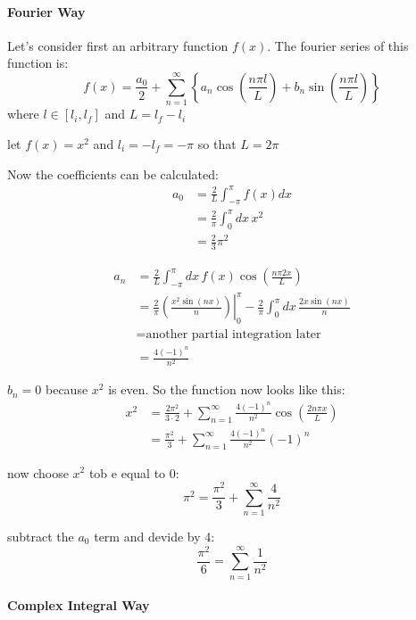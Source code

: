 \paragraph{Fourier Way}
Let's consider first an arbitrary function $f(x)$. The fourier series of this function is:
\begin{equation}
f(x) = \frac{a_0}{2} + \sum_{n=1}^\infty \left\lbrace a_n \cos\left( \frac{n \pi l}{L}  \right) + b_n \sin \left(  \frac{n \pi l}{L} \right)  \right\rbrace
\end{equation}
where $l\in [l_i,l_f]$ and $L = l_f - l_i$

let $f(x) = x^2$ and $l_i = -l_f = -\pi$ so that $L = 2\pi$

Now the coefficients can be calculated:
\begin{align}
a_0 &= \frac{2}{L} \int_{-\pi}^\pi f(x) dx \\
&= \frac{2}{\pi} \int_0^\pi dx\, x^2\\
&= \frac{2}{3}\pi^2
\end{align}

\begin{align}
a_n &= \frac{2}{L} \int_{-\pi}^\pi dx\, f(x) \cos\left(\frac{n \pi 2 x}{L} \right) \\
&= \frac{2}{\pi }\left.\left(  \frac{x^2 \sin(nx)}{n} \right)\right|_0^\pi - \frac{2}{\pi} \int_0^\pi dx\, \frac{2x \sin(nx)}{n}\\
&=\text{another partial integration later}\\
&= \frac{4 (-1)^n}{n^2}
\end{align}

$b_n = 0$ because $x^2$ is even. So the function now looks like this:
\begin{align}
x^2 &= \frac{2\pi^2}{3\cdot 2} + \sum_{n=1}^\infty \frac{4 (-1)^n}{n^2} \cos\left( \frac{2n\pi x}{L}  \right) \\
&= \frac{\pi^2}{3} + \sum_{n=1}^\infty \frac{4 (-1)^n}{n^2} (-1)^n
\end{align}

now choose $x^2$ tob e equal to 0:
\begin{equation}
\pi^2 = \frac{\pi^2}{3} + \sum_{n=1}^\infty \frac{4}{n^2}
\end{equation}

subtract the $a_0$ term and devide by 4:
\begin{equation}
\frac{\pi^2}{6} = \sum_{n=1}^\infty \frac{1}{n^2}
\end{equation}

\paragraph{Complex Integral Way}

